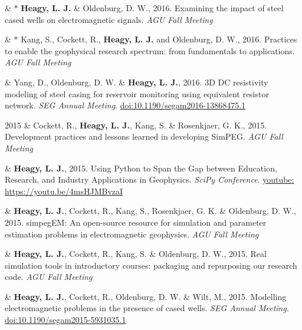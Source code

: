 \documentclass[a4paper, 11pt]{article}
\newcommand{\doi}[1]{\href{https://doi.org/#1}{doi:#1}}
\newcommand{\youtube}[1]{\href{https://youtu.be/XY3Tq9Wd1\_A}{youtube: #1}}
\begin{document}
\begin{entryright}
& $*$ \textbf{Heagy, L. J.} \& Oldenburg, D. W., 2016. Examining the impact of steel cased wells on electromagnetic signals. \emph{AGU Fall Meeting}
\end{entryright}

\begin{entryright}
& $*$ Kang, S., Cockett, R., \textbf{Heagy, L. J.} and Oldenburg, D. W., 2016. Practices to enable the geophysical research spectrum: from fundamentals to applications. \emph{AGU Fall Meeting}
\end{entryright}

\begin{entryright}
& Yang, D., Oldenburg, D. W. \& \textbf{Heagy, L. J.}, 2016. 3D DC resistivity modeling of steel casing for reservoir monitoring using equivalent resistor network. \emph{SEG Annual Meeting}. \doi{10.1190/segam2016-13868475.1}
\end{entryright}

\begin{entryright}
2015 & Cockett, R., \textbf{Heagy, L. J.}, Kang, S. \& Rosenkjaer, G. K., 2015. Development practices and lessons learned in developing SimPEG. \emph{AGU Fall Meeting}
\end{entryright}

\begin{entryright}
& \textbf{Heagy, L. J.}, 2015. Using Python to Span the Gap between Education, Research, and Industry Applications in Geophysics. \emph{SciPy Conference}. \youtube{https://youtu.be/4msHJMBvzaI}
\end{entryright}

\begin{entryright}
& \textbf{Heagy, L. J.}, Cockett, R., Kang, S., Rosenkjaer, G. K. \& Oldenburg, D. W., 2015. simpegEM: An open-source resource for simulation and parameter estimation problems in electromagnetic geophysics. \emph{AGU Fall Meeting}
\end{entryright}

\begin{entryright}
& \textbf{Heagy, L. J.}, Cockett, R., Kang, S. \& Oldenburg, D. W., 2015. Real simulation tools in introductory courses: packaging and repurposing our research code. \emph{AGU Fall Meeting}
\end{entryright}

\begin{entryright}
& \textbf{Heagy, L. J.}, Cockett, R., Oldenburg, D. W. \& Wilt, M., 2015. Modelling electromagnetic problems in the presence of cased wells. \emph{SEG Annual Meeting}. \doi{10.1190/segam2015-5931035.1}
\end{entryright}
\end{document}

